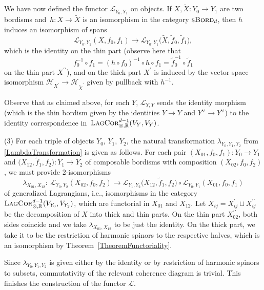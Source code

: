 \documentclass[10pt,a4paper]{amsart}
\numberwithin{equation}{section}
\newcommand{\LagCor}{\textsc{LagCor}}
\newcommand{\R}{\mathbb{R}}
\newcommand{\sBord}{\textsc{sBord}}
\begin{document}
We have now defined the functor $\mathcal{L}_{Y_0, Y_1}$ on objects.
If $X, \tilde{X}\colon Y_0 \to Y_1$ are two bordisms and~${h\colon X \to \tilde{X}}$ is an isomorphism in the category $\sBord_d$, then $h$ induces an isomorphism of spans
\[
\mathcal{L}_{Y_0, Y_1}(X, f_0, f_1) \longrightarrow \mathcal{L}_{Y_0, Y_1}\big(\tilde{X}, \tilde{f}_0, \tilde{f}_1\big),
\]
 which is the identity on the thin part (observe here that
\begin{equation*}
f_0^{-1} \circ f_1 = (h \circ f_0)^{-1} \circ h \circ f_1 = \tilde{f}_0^{-1} \circ \tilde{f}_1
\end{equation*}
on the thin part $X^{\prime\prime}$), and on the thick part $X^{\prime}$ is induced by the vector space isomorphism $\mathcal{H}_{{X}^{\prime}} \to \mathcal{H}_{\tilde{X}^\prime}$ given by pullback with $h^{-1}$.

Observe that as claimed above, for each $Y$, $\mathcal{L}_{Y, Y}$ sends the identity morphism (which is the thin bordism given by the identities $Y \to Y$ and $Y^\vee \to Y^\vee$) to the identity correspondence in~$\LagCor_{\otimes, \R}^{d-1}(V_Y, V_Y)$.

(3)
For each triple of objects $Y_0$, $Y_1$, $Y_2$, the natural transformation $\lambda_{Y_0, Y_1, Y_2}$ from \eqref{LambdaTransformation} is given as follows.
For each pair $(X_{01}, f_0, f_1)\colon Y_0 \to Y_1$ and $\big(X_{12}, \tilde{f}_1, f_2\big) \colon Y_1 \to Y_2$ of composable bordisms with composition $(X_{02}, f_0, f_2)$, we must provide 2-isomorphisms
\begin{equation*}
\lambda_{X_{01}, X_{12}} \colon\ \mathcal{L}_{Y_0, Y_2}(X_{02}, f_0, f_2) \longrightarrow \mathcal{L}_{Y_1, Y_2}\big(X_{12}, \tilde{f}_1, f_2\big) \circ \mathcal{L}_{Y_0, Y_1}(X_{01}, f_0, f_1)
\end{equation*}
of generalized Lagrangians, i.e., isomorphisms in the category $\LagCor_{\otimes, \R}^{d-1}(V_{Y_0}, V_{Y_2})$, which are functorial in $X_{01}$ and $X_{12}$.
Let $X_{ij} = X^\prime_{ij} \sqcup X^{\prime\prime}_{ij}$ be the decomposition of $X$ into thick and thin parts.
On the thin part $X_{02}^{\prime\prime}$, both sides coincide and we take $\lambda_{X_{01}, X_{12}}$ to be just the identity.
On the thick part, we take it to be the restriction of harmonic spinors to the respective halves, which is an isomorphism by Theorem~\ref{TheoremFunctoriality}.

Since $\lambda_{Y_0, Y_1, Y_2}$ is given either by the identity or by restriction of harmonic spinors to subsets, commutativity of the relevant coherence diagram is trivial.
This finishes the construction of the functor $\mathcal{L}$.
\end{document}
